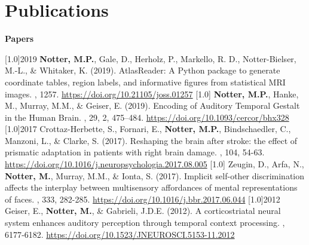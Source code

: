 \documentclass[english]{cv-style}
\begin{document}
\newpage


\section{Publications}

\large\textbf{Papers}\normalsize

\begin{publist}
\publications
  {\scalebox{.8}[1.0]{2019}}
  {\textbf{Notter, M.P.}, Gale, D., Herholz, P., Markello, R. D., Notter-Bielser, M.-L., \& Whitaker, K. (2019). AtlasReader: A Python package to generate coordinate tables, region labels, and informative figures from statistical MRI images. \color{gray}, 1257. \href{https://doi.org/10.21105/joss.01257}{https://doi.org/10.21105/joss.01257}}
\publications
  {\scalebox{.8}[1.0]{}}
  {\textbf{Notter, M.P.}, Hanke, M., Murray, M.M., \& Geiser, E. (2019). Encoding of Auditory Temporal Gestalt in the Human Brain. \color{gray}, 29, 2, 475–484. \href{https://doi.org/10.1093/cercor/bhx328}{https://doi.org/10.1093/cercor/bhx328}}
\publications
  {\scalebox{.8}[1.0]{2017}}
  {Crottaz-Herbette, S., Fornari, E., \textbf{Notter, M.P.}, Bindschaedler, C., Manzoni, L., \& Clarke, S. (2017). Reshaping the brain after stroke: the effect of prismatic adaptation in patients with right brain damage. \color{gray}, 104, 54-63. \href{https://doi.org/10.1016/j.neuropsychologia.2017.08.005}{https://doi.org/10.1016/j.neuropsychologia.2017.08.005}}
\publications
  {\scalebox{.8}[1.0]{}}
  {Zeugin, D., Arfa, N., \textbf{Notter, M.}, Murray, M.M., \& Ionta, S. (2017). Implicit self-other discrimination affects the interplay between multisensory affordances of mental representations of faces. \color{gray}, 333, 282-285. \href{https://doi.org/10.1016/j.bbr.2017.06.044}{https://doi.org/10.1016/j.bbr.2017.06.044}}
\publications
  {\scalebox{.8}[1.0]{2012}}
  {Geiser, E., \textbf{Notter, M.}, \& Gabrieli, J.D.E. (2012). A corticostriatal neural system enhances auditory perception through temporal context processing. \color{gray}, 6177‐6182. \href{https://doi.org/10.1523/JNEUROSCI.5153-11.2012}{https://doi.org/10.1523/JNEUROSCI.5153-11.2012}}
\end{publist}
\end{document}
